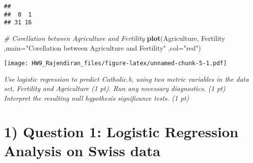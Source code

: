 \documentclass[]{article}
\newenvironment{Shaded}{\begin{snugshade}}{\end{snugshade}}
\newcommand{\CommentTok}[1]{\textcolor[rgb]{0.56,0.35,0.01}{\textit{#1}}}
\newcommand{\DataTypeTok}[1]{\textcolor[rgb]{0.13,0.29,0.53}{#1}}
\newcommand{\KeywordTok}[1]{\textcolor[rgb]{0.13,0.29,0.53}{\textbf{#1}}}
\newcommand{\NormalTok}[1]{#1}
\newcommand{\StringTok}[1]{\textcolor[rgb]{0.31,0.60,0.02}{#1}}
\begin{document}
\begin{verbatim}
## 
##  0  1 
## 31 16
\end{verbatim}

\begin{Shaded}
\begin{Highlighting}[]
\CommentTok{# Corellation between Agriculture and Fertility}
\KeywordTok{plot}\NormalTok{(Agriculture, Fertility}
\NormalTok{     ,}\DataTypeTok{main=}\StringTok{"Corellation between Agriculture and Fertility"}
\NormalTok{     ,}\DataTypeTok{col=}\StringTok{"red"}\NormalTok{)}
\end{Highlighting}
\end{Shaded}

\texttt{[image: HW9\_Rajendiran\_files/figure-latex/unnamed-chunk-5-1.pdf]}

\emph{Use logistic regression to predict Catholic.b, using two metric
variables in the data set, Fertility and Agriculture (1 pt). Run any
necessary diagnostics. (1 pt) Interpret the resulting null hypothesis
significance tests. (1 pt)}

\hypertarget{question-1-logistic-regression-analysis-on-swiss-data}{%
\section{1) Question 1: Logistic Regression Analysis on Swiss
data}\label{question-1-logistic-regression-analysis-on-swiss-data}}
\end{document}

